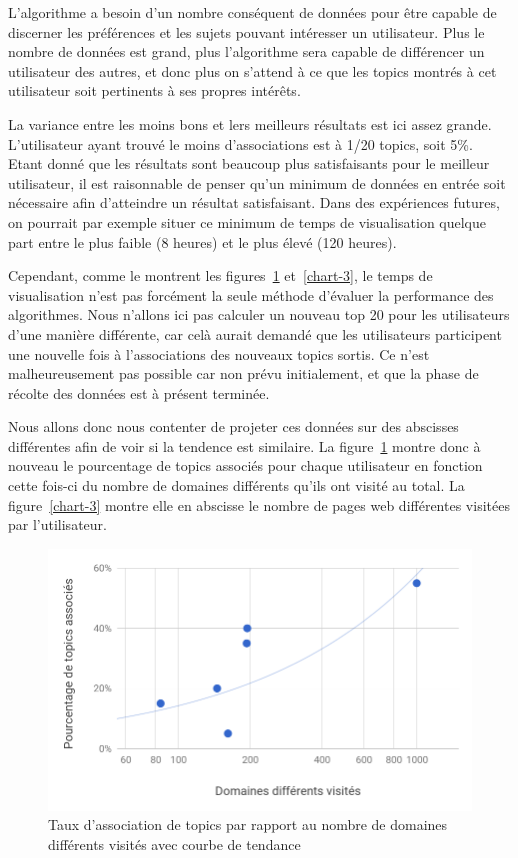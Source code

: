 			L'algorithme a besoin d'un nombre conséquent de données pour être capable de discerner les préférences et les sujets pouvant intéresser un utilisateur. Plus le nombre de données est grand, plus l'algorithme sera capable de différencer un utilisateur des autres, et donc plus on s'attend à ce que les topics montrés à cet utilisateur soit pertinents à ses propres intérêts.

			La variance entre les moins bons et lers meilleurs résultats est ici assez grande. L'utilisateur ayant trouvé le moins d'associations est à 1/20 topics, soit 5\%. Etant donné que les résultats sont beaucoup plus satisfaisants pour le meilleur utilisateur, il est raisonnable de penser qu'un minimum de données en entrée soit nécessaire afin d'atteindre un résultat satisfaisant. Dans des expériences futures, on pourrait par exemple situer ce minimum de temps de visualisation quelque part entre le plus faible (8 heures) et le plus élevé (120 heures).

			Cependant, comme le montrent les figures~\ref{chart-2} et~\ref{chart-3}, le temps de visualisation n'est pas forcément la seule méthode d'évaluer la performance des algorithmes. Nous n'allons ici pas calculer un nouveau top 20 pour les utilisateurs d'une manière différente, car celà aurait demandé que les utilisateurs participent une nouvelle fois à l'associations des nouveaux topics sortis. Ce n'est malheureusement pas possible car non prévu initialement, et que la phase de récolte des données est à présent terminée.
			
			Nous allons donc nous contenter de projeter ces données sur des abscisses différentes afin de voir si la tendence est similaire. La figure~\ref{chart-2} montre donc à nouveau le pourcentage de topics associés pour chaque utilisateur en fonction cette fois-ci du nombre de domaines différents qu'ils ont visité au total. La figure~\ref{chart-3} montre elle en abscisse le nombre de pages web différentes visitées par l'utilisateur.

			\begin{figure}[!h]
				\centering
				\includegraphics[height=0.6\textwidth]{images/results/chart-2}
				\caption{Taux d'association de topics par rapport au nombre de domaines différents visités avec courbe de tendance}
				\label{chart-2}
			\end{figure}

